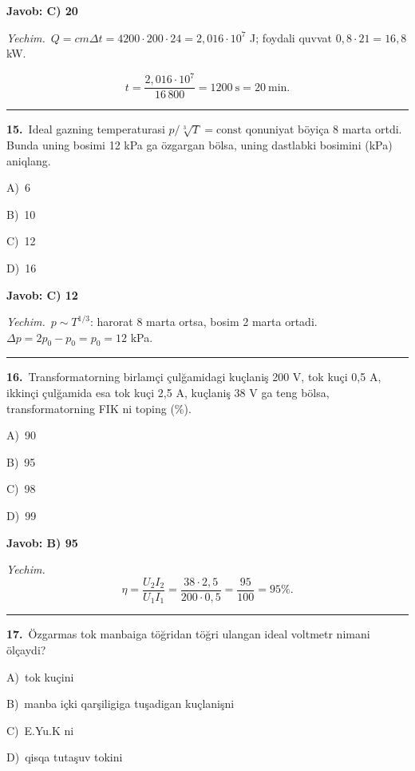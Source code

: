 \documentclass[11pt,a4paper]{article}
\newcommand{\opt}[2]{\hspace*{4mm}#1)\ #2\par}
\begin{document}
\noindent\colorbox{gray!12}{\parbox{\dimexpr\linewidth-2\fboxsep}{\textbf{Javob: C) 20}}}\par\smallskip
\noindent\textit{Yechim.}\ $Q=cm\Delta t=4200\cdot200\cdot24=2{,}016\cdot10^7$ J; foydali quvvat $0{,}8\cdot21=16{,}8$ kW.\par
\[t=\frac{2{,}016\cdot10^7}{16\,800}=1200\ \text{s}=20\ \text{min}.\]\par\medskip\hrule\medskip
{}\noindent\begin{minipage}{\linewidth}
\textbf{15.}\ Ideal gazning temperaturasi $p/\sqrt[3]{T}=\mathrm{const}$ qonuniyat böyiça 8 marta ortdi. Bunda uning bosimi 12 kPa ga özgargan bölsa, uning dastlabki bosimini (kPa) aniqlang.\par\smallskip
\opt{A}{6}
\opt{B}{10}
\opt{C}{12}
\opt{D}{16}
\end{minipage}\vspace{2pt}\par
\noindent\colorbox{gray!12}{\parbox{\dimexpr\linewidth-2\fboxsep}{\textbf{Javob: C) 12}}}\par\smallskip
\noindent\textit{Yechim.}\ $p\sim T^{1/3}$: harorat 8 marta ortsa, bosim 2 marta ortadi. $\Delta p=2p_0-p_0=p_0=12$ kPa.\par\par\medskip\hrule\medskip
{}\noindent\begin{minipage}{\linewidth}
\textbf{16.}\ Transformatorning birlamçi çulğamidagi kuçlaniş 200 V, tok kuçi 0,5 A, ikkinçi çulğamida esa tok kuçi 2,5 A, kuçlaniş 38 V ga teng bölsa, transformatorning FIK ni toping (\%).\par\smallskip
\opt{A}{90}
\opt{B}{95}
\opt{C}{98}
\opt{D}{99}
\end{minipage}\vspace{2pt}\par
\noindent\colorbox{gray!12}{\parbox{\dimexpr\linewidth-2\fboxsep}{\textbf{Javob: B) 95}}}\par\smallskip
\noindent\textit{Yechim.}\ \[\eta=\frac{U_2I_2}{U_1I_1}=\frac{38\cdot2{,}5}{200\cdot0{,}5}=\frac{95}{100}=95\%.\]\par\medskip\hrule\medskip
{}\noindent\begin{minipage}{\linewidth}
\textbf{17.}\ Özgarmas tok manbaiga töğridan töğri ulangan ideal voltmetr nimani ölçaydi?\par\smallskip
\opt{A}{tok kuçini}
\opt{B}{manba içki qarşiligiga tuşadigan kuçlanişni}
\opt{C}{E.Yu.K ni}
\opt{D}{qisqa tutaşuv tokini}
\end{minipage}\vspace{2pt}\par
\end{document}
